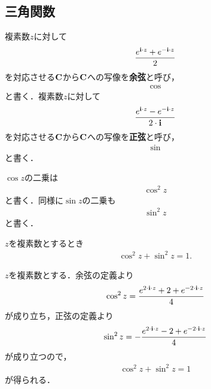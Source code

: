 \subsection{三角関数}
	\begin{screen}
		\begin{dfn}[三角関数]
			複素数$z$に対して
			\begin{align}
				\frac{e^{\mathbf{i} \cdot z} + e^{-\mathbf{i} \cdot z}}{2}
			\end{align}
			を対応させる$\mathbf{C}$から$\mathbf{C}$への写像を{\bf 余弦}と呼び，
			\begin{align}
				\cos
			\end{align}
			と書く．複素数$z$に対して
			\begin{align}
				\frac{e^{\mathbf{i} \cdot z} - e^{-\mathbf{i} \cdot z}}{2 \cdot \mathbf{i}}
			\end{align}
			を対応させる$\mathbf{C}$から$\mathbf{C}$への写像を{\bf 正弦}と呼び，
			\begin{align}
				\sin
			\end{align}
			と書く．
		\end{dfn}
	\end{screen}
	
	$\cos{z}$の二乗は
	\begin{align}
		\cos^2{z}
	\end{align}
	と書く．同様に$\sin{z}$の二乗も
	\begin{align}
		\sin^2{z}
	\end{align}
	と書く．
	
	\begin{screen}
		\begin{thm}[余弦と正弦の二乗和は$1$]
			$z$を複素数とするとき
			\begin{align}
				\cos^2{z} + \sin^2{z} = 1.
			\end{align}
		\end{thm}
	\end{screen}
	
	\begin{sketch}
		$z$を複素数とする．余弦の定義より
		\begin{align}
			\cos^2{z} = \frac{e^{2 \cdot \mathbf{i} \cdot z} + 2 + e^{-2 \cdot \mathbf{i} \cdot z}}{4}
		\end{align}
		が成り立ち，正弦の定義より
		\begin{align}
			\sin^2{z} = -\frac{e^{2 \cdot \mathbf{i} \cdot z} - 2 + e^{-2 \cdot \mathbf{i} \cdot z}}{4}
		\end{align}
		が成り立つので，
		\begin{align}
			\cos^2{z} + \sin^2{z} = 1
		\end{align}
		が得られる．
		\QED
	\end{sketch}
	
